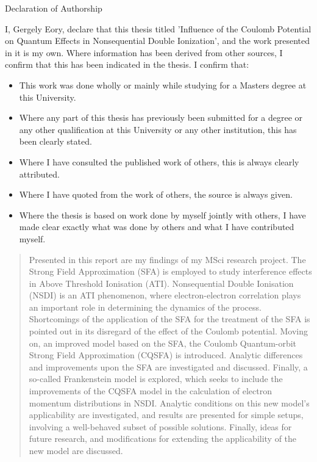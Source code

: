 \documentclass[11pt]{article}
\numberwithin{equation}{section}
\begin{document}
\begin{center}
    \vspace*{2cm}
    \huge
    Declaration of Authorship
    \vspace{3cm}
\end{center}
\normalsize
I, Gergely Eory, declare that this thesis titled 'Influence of the Coulomb Potential on Quantum Effects in Nonsequential Double Ionization', and the work presented in it is my own. Where information has been derived from other sources, I confirm that this has been indicated in the thesis. I confirm that:
\begin{itemize}
    \item This work was done wholly or mainly while studying for a Masters degree at this University.
    \item Where any part of this thesis has previously been submitted for a degree or any other qualification at this University or any other institution, this has been clearly stated.
    \item Where I have consulted the published work of others, this is always clearly attributed.
    \item Where I have quoted from the work of others, the source is always given.
    \item Where the thesis is based on work done by myself jointly with others, I have made clear exactly what was done by others and what I have contributed myself.
\end{itemize}
\newpage
\vspace*{3cm}
\begin{abstract}
Presented in this report are my findings of my MSci research project. The Strong Field Approximation (SFA) is employed to study interference effects in Above Threshold Ionisation (ATI). Nonsequential Double Ionisation (NSDI) is an ATI phenomenon, where electron-electron correlation plays an important role in determining the dynamics of the process. Shortcomings of the application of the SFA for the treatment of the SFA is pointed out in its disregard of the effect of the Coulomb potential. Moving on, an improved model based on the SFA, the Coulomb Quantum-orbit Strong Field Approximation (CQSFA) is introduced. Analytic differences and improvements upon the SFA are investigated and discussed. Finally, a so-called Frankenstein model is explored, which seeks to include the improvements of the CQSFA model in the calculation of electron momentum distributions in NSDI. Analytic conditions on this new model's applicability are investigated, and results are presented for simple setups, involving a well-behaved subset of possible solutions. Finally, ideas for future research, and modifications for extending the applicability of the new model are discussed.
\end{abstract}
\newpage
\end{document}
